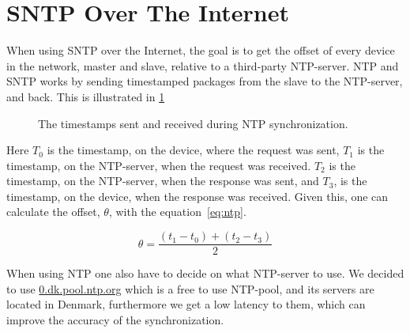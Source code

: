 \section{\acs{SNTP} Over The Internet}\label{sec:sntp_over_the_internet}
When using \ac{SNTP} over the Internet, the goal is to get the offset of every device in the network, master and slave, relative to a third-party \ac{NTP}-server.
\ac{NTP} and \ac{SNTP} works by sending timestamped packages from the slave to the \ac{NTP}-server, and back.
This is illustrated in \cref{fig:ntp_packets}

\begin{figure}[htb]
    \centering
    \caption{The timestamps sent and received during \ac{NTP} synchronization.}\label{fig:ntp_packets}
\end{figure}

Here $T_0$ is the timestamp, on the device, where the request was sent, $T_1$ is the timestamp, on the \ac{NTP}-server, when the request was received.
$T_2$ is the timestamp, on the \ac{NTP}-server, when the response was sent, and $T_3$, is the timestamp, on the device, when the response was received.
Given this, one can calculate the offset, $\theta$, with the equation\ \ref{eq:ntp}.

\begin{equation}\label{eq:ntp}
    \theta = \frac{(t_1 - t_0)+(t_2 - t_3)}{2}
\end{equation}

When using \ac{NTP} one also have to decide on what \ac{NTP}-server to use.
We decided to use \url{0.dk.pool.ntp.org} which is a free to use \ac{NTP}-pool, and its servers are located in Denmark, furthermore we get a low latency to them, which can improve the accuracy of the synchronization.

